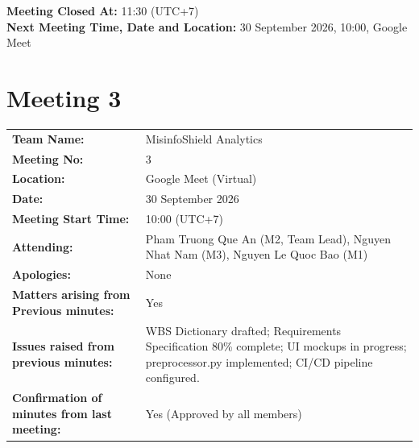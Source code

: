 \documentclass[11pt, a4paper]{article}
\begin{document}
\vspace{0.3cm}
\noindent \textbf{Meeting Closed At:} 11:30 (UTC+7)\\
\textbf{Next Meeting Time, Date and Location:} 30 September 2026, 10:00, Google Meet

\newpage

\section*{Meeting 3}
\label{sec:meeting3}

\begin{table}[H]
  \centering
  \small
  \begin{tabularx}{\linewidth}{@{}L{3.5cm} Y@{}}
    \toprule
    \textbf{Team Name:} & MisinfoShield Analytics \\
    \textbf{Meeting No:} & 3 \\
    \textbf{Location:} & Google Meet (Virtual) \\
    \textbf{Date:} & 30 September 2026 \\
    \textbf{Meeting Start Time:} & 10:00 (UTC+7) \\
    \textbf{Attending:} & Pham Truong Que An (M2, Team Lead), Nguyen Nhat Nam (M3), Nguyen Le Quoc Bao (M1) \\
    \textbf{Apologies:} & None \\
    \textbf{Matters arising from Previous minutes:} & Yes \\
    \textbf{Issues raised from previous minutes:} & WBS Dictionary drafted; Requirements Specification 80\% complete; UI mockups in progress; preprocessor.py implemented; CI/CD pipeline configured. \\
    \textbf{Confirmation of minutes from last meeting:} & Yes (Approved by all members) \\
    \bottomrule
  \end{tabularx}
\end{table}
\end{document}
